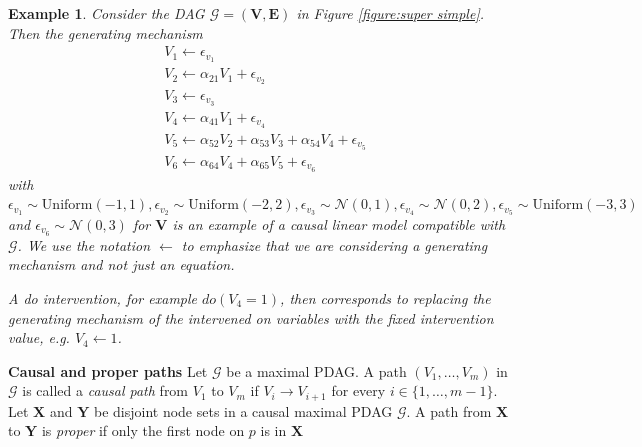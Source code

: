 \documentclass[11pt,a4paper]{article}
\newtheorem{Example}[Satz]{Example}
\theoremstyle{definition}
\theoremstyle{remark}
\newtheorem{Remark}[Satz]{Remark}
\newcommand{\mpdag}{maximal PDAG}
\newcommand{\g}[1][G]{\mathcal{#1}}
\begin{document}
\begin{Example}
	\label{examle: linear SEM}
	Consider the DAG $\g=(\mathbf{V},\mathbf{E})$ in Figure \ref{figure:super simple}. Then the generating mechanism 
	\begin{align*}
	&V_1 \leftarrow \epsilon_{v_1} \\
	&V_2 \leftarrow \alpha_{21}V_1 +\epsilon_{v_2} \\
	&V_3 \leftarrow \epsilon_{v_3}\\
	&V_4 \leftarrow\alpha_{41}V_1 + \epsilon_{v_4}\\
	&V_5 \leftarrow\alpha_{52}V_2 + \alpha_{53}V_3 + \alpha_{54}V_4 + \epsilon_{v_5}\\
	&V_6 \leftarrow\alpha_{64}V_4 + \alpha_{65}V_5 + \epsilon_{v_6}
	\end{align*}
	with $\epsilon_{v_1} \sim \mathrm{Uniform}(-1,1),\epsilon_{v_2} \sim \mathrm{Uniform}(-2,2),\epsilon_{v_3} \sim \mathcal{N}(0,1),\epsilon_{v_	4} \sim \mathcal{N}(0,2),\epsilon_{v_5} \sim \mathrm{Uniform}(-3,3)$ and $\epsilon_{v_6} \sim \mathcal{N}(0,3)$ for $\mathbf{V}$ is an example of a causal linear model compatible with $\g$. We use the notation $\leftarrow$ to emphasize that we are considering a generating mechanism and not just an equation.
	
	A do intervention, for example $do(V_4=1)$, then corresponds to replacing the generating mechanism of the intervened on variables with the fixed intervention value, e.g. $V_4 \leftarrow 1$.
	
\end{Example}






\noindent \textbf{Causal and proper paths} Let $\g$ be a \mpdag{}. A path $(V_1,\dots, V_m)$ in $\g$ is called a \textit{causal path} from $V_1$ to $V_m$ if $V_i \rightarrow V_{i+1}$ for every $i \in \{1,\dots, m-1\}$. 
Let $\mathbf{X}$ and $\mathbf{Y}$ be disjoint node sets in a causal \mpdag{} $\g$. A path from $\mathbf{X}$ to $\mathbf{Y}$ is \textit{proper} if only the first node on $p$ is in $\mathbf{X}$
\end{document}
